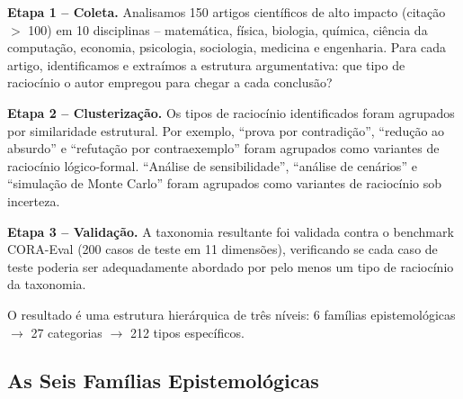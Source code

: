 \documentclass[12pt,a4paper,sumario=tradicional,openany]{abntex2}
\begin{document}
\textbf{Etapa 1 -- Coleta.} Analisamos 150 artigos científicos de alto impacto (citação $>$ 100) em 10 disciplinas -- matemática, física, biologia, química, ciência da computação, economia, psicologia, sociologia, medicina e engenharia. Para cada artigo, identificamos e extraímos a estrutura argumentativa: que tipo de raciocínio o autor empregou para chegar a cada conclusão?

\textbf{Etapa 2 -- Clusterização.} Os tipos de raciocínio identificados foram agrupados por similaridade estrutural. Por exemplo, ``prova por contradição'', ``redução ao absurdo'' e ``refutação por contraexemplo'' foram agrupados como variantes de raciocínio lógico-formal. ``Análise de sensibilidade'', ``análise de cenários'' e ``simulação de Monte Carlo'' foram agrupados como variantes de raciocínio sob incerteza.

\textbf{Etapa 3 -- Validação.} A taxonomia resultante foi validada contra o benchmark CORA-Eval (200 casos de teste em 11 dimensões), verificando se cada caso de teste poderia ser adequadamente abordado por pelo menos um tipo de raciocínio da taxonomia.

O resultado é uma estrutura hierárquica de três níveis: 6 famílias epistemológicas $\rightarrow$ 27 categorias $\rightarrow$ 212 tipos específicos.

\subsection{As Seis Famílias Epistemológicas}
\end{document}
